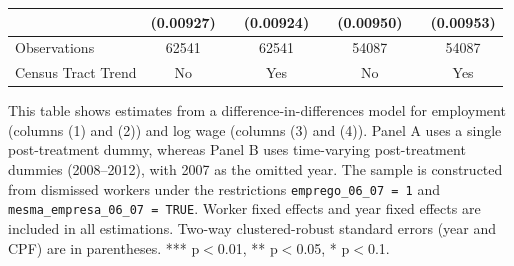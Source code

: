 \begin{table}[htb]
{\begin{threeparttable}
\begin{tabular}{l c p{0.60cm} c p{0.25cm} c p{0.25cm} c}
                    & (0.00927) & & (0.00924) & & (0.00950) & & (0.00953) \\
    \midrule
    Observations            & 62541 & & 62541 & & 54087 & & 54087 \\
    Census Tract Trend      & No          & & Yes         & & No         & & Yes \\
    \bottomrule
    \end{tabular}%
    \begin{tablenotes}[flushleft]
    \item \small This table shows estimates from a difference-in-differences model for employment (columns (1) and (2)) and log wage (columns (3) and (4)). Panel A uses a single post-treatment dummy, whereas Panel B uses time-varying post-treatment dummies (2008--2012), with 2007 as the omitted year. The sample is constructed from dismissed workers under the restrictions \texttt{emprego\_06\_07 = 1} and \texttt{mesma\_empresa\_06\_07 = TRUE}. Worker fixed effects and year fixed effects are included in all estimations. Two-way clustered-robust standard errors (year and CPF) are in parentheses. *** p$<$0.01, ** p$<$0.05, * p$<$0.1.
    \end{tablenotes}
    \end{threeparttable}
    }
\end{table}
